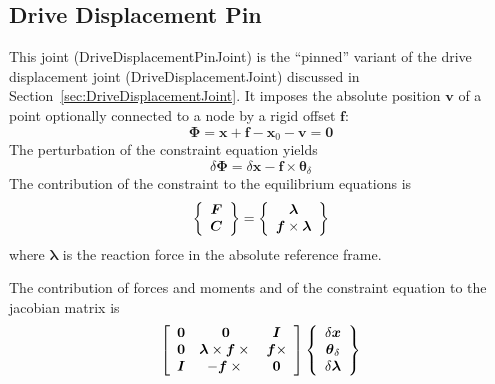 \documentclass[10pt,dvips,fleqn]{report}
\newcommand{\T}[1]{\boldsymbol{#1}}
\begin{document}
\subsection{Drive Displacement Pin}
\label{sec:DriveDisplacementPinJoint}
This joint (DriveDisplacementPinJoint) is the ``pinned'' variant 
of the drive displacement joint (DriveDisplacementJoint) discussed
in Section~\ref{sec:DriveDisplacementJoint}.
It imposes the absolute position $\T{v}$ of a point
optionally connected to a node by a rigid offset $\T{f}$:
\begin{equation}
	\T{\Phi} = \T{x} + \T{f} - \T{x}_0 - \T{v} = \T{0}
\end{equation}
The perturbation of the constraint equation yields
\begin{equation}
	\delta\T{\Phi} = 
	\delta\T{x} - \T{f}\times \T{\theta}_{\delta}
\end{equation}
The contribution of the constraint to the equilibrium equations is
\begin{equation}
	\cubr{\cvvect{
		\T{F} \\
		\T{C}
	}} = \cubr{\cvvect{
		\T{\lambda} \\
		\T{f}\times \T{\lambda}
	}}
\end{equation}
where $\T{\lambda}$ is the reaction force in the absolute reference frame.

The contribution of forces and moments and of the constraint equation 
to the jacobian matrix is
\begin{equation}
	\sqbr{\matr{ccc}{
		\T{0} &
			\T{0} &
			\T{I} \\
		\T{0} &
			\T{\lambda}\times\T{f}\times{} &
			\T{f}\times \\
		\T{I} &
			- \T{f}\times{} &
			\T{0}
	}}\cubr{\cvvect{
		\delta\T{x} \\
		\T{\theta}_{\delta} \\
		\delta\T{\lambda}
	}}
\end{equation}
\end{document}
